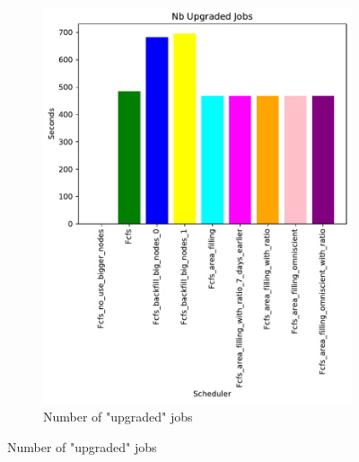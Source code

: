 \documentclass[a4paper]{article}
\begin{document}
\begin{figure}[H]
\begin{subfigure}[b]{0.4\linewidth}\centering\includegraphics[width=0.95\linewidth]{MBSS/plot/Size_Constraint_2022-01-17->2022-01-17_V9532_Nb_Upgraded_Jobs_450_128_32_256_4_1024.pdf}\caption{Number of "upgraded" jobs}\label{45}\end{subfigure}

\end{figure}
\end{document}
